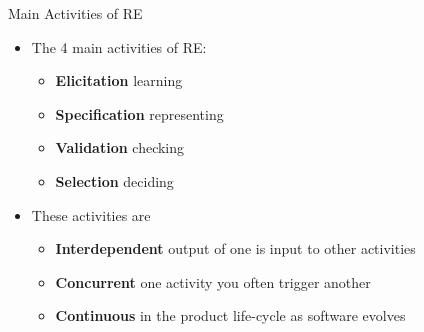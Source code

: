 
\begin{Slide}{Main Activities of RE}

{\vspace{1em}\resizebox{!}{3em}{\hspace{0.5em}{\bf ?}\hspace{0.5em}\WritingHand\hspace{0.5em}\Checkedbox\hspace{0.5em}\LeftScissors}\vspace{0.5em}}

\begin{itemize}
\item The 4 main activities of RE: 
\begin{itemize}
\item \textbf{Elicitation} \hfill learning
\item \textbf{Specification} \hfill representing
\item \textbf{Validation}  \hfill checking
\item \textbf{Selection}   \hfill deciding
\end{itemize}
\item These activities are
\begin{itemize}
\item \textbf{Interdependent} \hfill output of one is input to other activities
\item \textbf{Concurrent} \hfill one activity you often trigger another
\item \textbf{Continuous} \hfill in the product life-cycle as software evolves

\end{itemize}
\end{itemize}
\end{Slide}